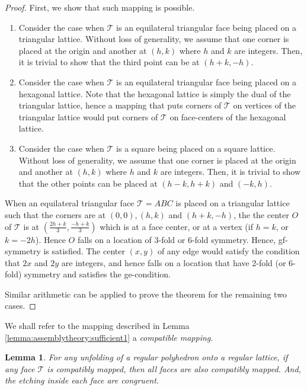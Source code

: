 \documentclass[11pt]{article}
\newtheorem{lemma}[thm]{Lemma}
\newcommand{\1}{\mathds{1}}
\begin{document}
\begin{proof}
 First, we show that such mapping is possible.
 \begin{enumerate}
  \item Consider the case when $\mathcal{T}$ is an equilateral triangular face being placed on a triangular lattice. Without loss of generality, we assume that one corner is placed at the origin and another at $(h,k)$ where $h$ and $k$ are integers. Then, it is trivial to show that the third point can be at $(h+k,-h)$.
  \item Consider the case when $\mathcal{T}$ is an equilateral triangular face being placed on a hexagonal lattice. Note that the hexagonal lattice is simply the dual of the triangular lattice, hence a mapping that puts corners of $\mathcal{T}$ on vertices of the triangular lattice would put corners of $\mathcal{T}$ on face-centers of the hexagonal lattice.
 \item Consider the case when $\mathcal{T}$ is a square being placed on a square lattice. Without loss of generality, we assume that one corner is placed at the origin and another at $(h,k)$ where $h$ and $k$ are integers. Then, it is trivial to show that the other points can be placed at $(h-k, h+k)$ and $(-k, h)$.
 \end{enumerate}

 When an equilateral triangular face $\mathcal{T}=ABC$ is placed on a triangular lattice such that the corners are at $(0,0), (h,k)$ and $(h+k,-h)$, the the center $O$ of $\mathcal{T}$ is at $(\frac{2h+k}{3},\frac{-h+k}{3})$ which is at a face center, or at a vertex (if $h=k$, or $k=-2h$). Hence $O$ falls on a location of 3-fold or 6-fold symmetry. Hence, gf-symmetry is satisfied. The center $(x,y)$ of any edge would satisfy the condition that $2x$ and $2y$ are integers, and hence falls on a location that have 2-fold (or 6-fold) symmetry and satisfies the ge-condition.

 Similar arithmetic can be applied to prove the theorem for the remaining two cases.
\end{proof}

We shall refer to the mapping described in Lemma \ref{lemma:assemblytheory:sufficient1} a \emph{compatible mapping}.


\begin{lemma}
\label{lemma:assemblytheory:sufficient2}
 For any unfolding of a regular polyhedron onto a regular lattice, if any face $\mathcal{T}$ is compatibly mapped, then all faces are also compatibly mapped. And, the etching inside each face are congruent.
\end{lemma}
\end{document}
